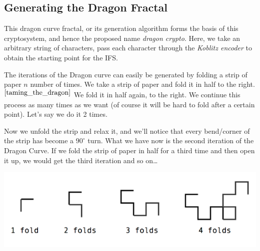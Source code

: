 \documentclass[cryptography,article,submit,moreauthors,pdftex]{Definitions/mdpi}
\begin{document}
\subsection{Generating the Dragon Fractal}
\begin{flushleft}
    This dragon curve fractal, or its generation algorithm forms the basis of this cryptosystem, and hence the proposed name \textit{dragon crypto}. Here, we take an arbitrary string of characters, pass each character through the \textit{Koblitz encoder} to obtain the starting point for the IFS.
\end{flushleft}

\begin{flushleft}
	The iterations of the Dragon curve can easily be generated by folding a strip of paper $n$ number of times. We take a strip of paper and fold it in half to the right.$^{\cite{taming_the_dragon}}$ We fold it in half again, to the right. We continue this process as many times as we want (of course it will be hard to fold after a certain point). Let’s say we do it 2 times.
\end{flushleft}

\begin{flushleft}
    Now we unfold the strip and relax it, and we’ll notice that every bend/corner of the strip has become a $90^{\circ}$ turn. What we have now is the second iteration of the Dragon Curve. If we fold the strip of paper in half for a third time and then open it up, we would get the third iteration and so on…
\end{flushleft}

\begin{center}
    \begin{center}
        \includegraphics[scale=0.7]{images/paper folding.png}
    \end{center}
\end{center}
\end{document}
